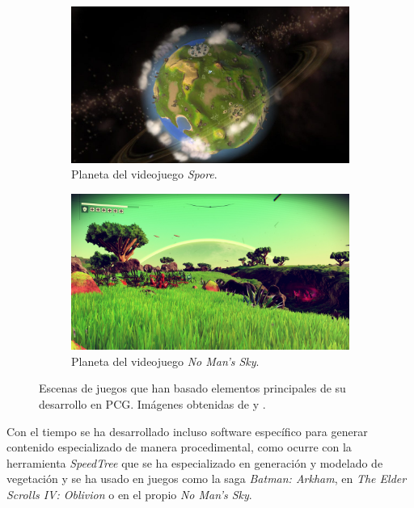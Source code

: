 \begin{figure}[H]
    \centering
        \begin{subfigure}[b]{0.49\textwidth}
            \includegraphics[width=\textwidth]{img/spore.jpg}
            \caption{Planeta del videojuego \textit{Spore}.}
        \end{subfigure}
        \hfill
        \begin{subfigure}[b]{0.49\textwidth}
            \includegraphics[width=\textwidth]{img/jake.jpeg}
            \caption{Planeta del videojuego \textit{No Man's Sky}.}
        \end{subfigure}
        \caption{Escenas de juegos que han basado elementos principales de su desarrollo en PCG. Imágenes obtenidas de \cite{spore} y \cite{jake}.}
\end{figure}

Con el tiempo se ha desarrollado incluso software específico para generar contenido especializado de manera procedimental, como ocurre con la herramienta \textit{SpeedTree} \cite{speedtree} que se ha especializado en generación y modelado de vegetación y se ha usado en juegos como la saga \textit{Batman: Arkham}, en \textit{The Elder Scrolls IV: Oblivion} o en el propio \textit{No Man's Sky}.\\

